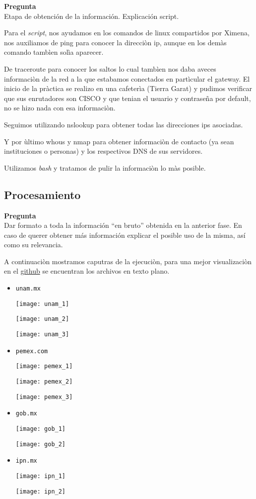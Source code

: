 \documentclass{article}
\newenvironment{problem}[2][Pregunta]
    { \begin{mdframed}[backgroundcolor=gray!20] \textbf{#1 #2} \\}
    {  \end{mdframed}}
\begin{document}
\begin{problem}
{} Etapa de obtención de la información. Explicación script.  
\end{problem}

Para el {\it script}, nos ayudamos en los comandos de linux compartidos por Ximena,
nos auxiliamos de ping para conocer la direcciòn ip, aunque en los demàs comando tambìen solìa aparecer.

De traceroute para conocer los saltos lo cual tambìen nos daba aveces informaciòn de la red a la
que estabamos conectados en partìcular el gateway. El inicio de la pràctica se realizo en una cafeterìa
(Tierra Garat) y pudimos verificar que sus enrutadores son CISCO y que tenian el usuario y contraseña
por default, no se hizo nada con esa informaciòn.

Seguimos utilizando nslookup para obtener todas las direcciones ips asociadas.

Y por ùltimo whous y nmap para obtener informaciòn de contacto (ya sean instituciones o personas)
y los respectivos DNS de sus servidores.

Utilizamos {\it bash} y tratamos de pulir la informaciòn lo màs posible. 
\subsection{Procesamiento}

\begin{problem}
{} Dar formato a toda la información “en bruto” obtenida en la anterior fase.
En caso de querer obtener más información explicar el posible uso de la misma, así como su
relevancia.  
\end{problem}

A continuaciòn mostramos caputras de la ejecuciòn, para una mejor visualizaciòn
en el \href{https://github.com/DiegoMendezMedina/Cripto-Seguridad/tree/main/Lab/Practicas/01/out}{github}
se encuentran los archivos en texto plano.

\begin{itemize}
\item {\tt unam.mx}

  \texttt{[image: unam\_1]}
  
  \texttt{[image: unam\_2]}

  \texttt{[image: unam\_3]}
\item {\tt pemex.com}

  
  \texttt{[image: pemex\_1]}
  
  \texttt{[image: pemex\_2]}

  \texttt{[image: pemex\_3]}
\item {\tt gob.mx}

  \texttt{[image: gob\_1]}
  
  \texttt{[image: gob\_2]}
\item {\tt ipn.mx}

  \texttt{[image: ipn\_1]}
  
  \texttt{[image: ipn\_2]}
\end{itemize}
\end{document}
